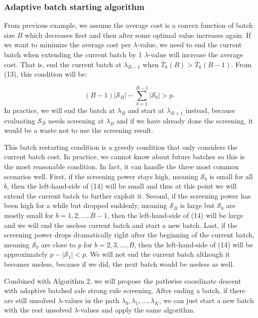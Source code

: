 \documentclass{article}
\begin{document}
\subsubsection{Adaptive batch starting algorithm}

From previous example, we assume the average cost is a convex function of batch size $B$ which decreases first and then after some optimal value increases again. If we want to minimize the average cost per $\lambda$-value, we need to end the current batch when extending the current batch by 1 $\lambda$-value will increase the average cost. That is, end the current batch at $\lambda_{B-1}$ when $\bar{T}_k(B)>\bar{T}_k(B-1)$. From (13), this condition will be:

\begin{equation}
    (B-1)|\mathcal{S}_B|-\sum_{b=1}^{B-1}|\mathcal{S}_b|>p.
\end{equation}
In practice, we will end the batch at $\lambda_B$ and start at $\lambda_{B+1}$ instead, because evaluating $\mathcal{S}_B$ needs screening at $\lambda_B$ and if we have already done the screening, it would be a waste not to use the screening result.

This batch restarting condition is a greedy condition that only considers the current batch cost. In practice, we cannot know about future batches so this is the most reasonable condition. In fact, it can handle the three most common scenarios well. First, if the screening power stays high, meaning $\mathcal{S}_b$ is small for all $b$, then the left-hand-side of (14) will be small and thus at this point we will extend the current batch to further exploit it. Second, if the screening power has been high for a while but dropped suddenly, meaning $\mathcal{S}_B$ is large but $\mathcal{S}_b$ are mostly small for $b=1,2,...,B-1$, then the left-hand-side of (14) will be large and we will end the useless current batch and start a new batch. Last, if the screening power drops dramatically right after the beginning of the current batch, meaning $\mathcal{S}_b$ are close to $p$ for $b=2,3,...,B$, then the left-hand-side of (14) will be approximately $p-|\mathcal{S}_1|<p$. We will not end the current batch although it becomes useless, because if we did, the next batch would be useless as well.

Combined with Algorithm 2, we will propose the pathwise coordinate descent with adaptive batched safe strong rule screening. After ending a batch, if there are still unsolved $\lambda$-values in the path $\lambda_0,\lambda_1,...,\lambda_K$, we can just start a new batch with the rest unsolved $\lambda$-values and apply the same algorithm.
\end{document}
